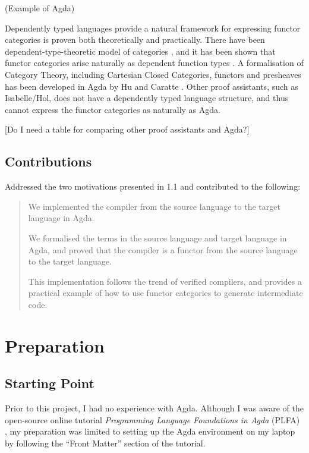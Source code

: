 \documentclass[12pt,twoside,a4paper]{report}
\theoremstyle{definition}
\newcounter{motivation}
\begin{document}
        (Example of Agda)

        Dependently typed languages provide a natural framework for expressing functor categories is proven both theoretically and practically. There have been dependent-type-theoretic model of categories \cite{Dybjer}, and it has been shown that functor categories arise naturally as dependent function types \cite{Jacobs}. A formalisation of Category Theory, including Cartesian Closed Categories, functors and presheaves has been developed in Agda by Hu and Caratte \cite{Cat_Agda}. Other proof assistants, such as Isabelle/Hol, does not have a dependently typed language structure, and thus cannot express the functor categories as naturally as Agda.

        [Do I need a table for comparing other proof assistants and Agda?]

    \section{Contributions}
        Addressed the two motivations presented in 1.1 and contributed to the following:
        \begin{quote}
            \savedmotivationI
            We implemented the compiler from the source language to the target language in Agda. 

            \savedmotivationII
            We formalised the terms in the source language and target language in Agda, and proved that the compiler is a functor from the source language to the target language. 

            \savedmotivationIII
            This implementation follows the trend of verified compilers, and provides a practical example of how to use functor categories to generate intermediate code.
        \end{quote}


\chapter{Preparation}
    \minitoc

    \section{Starting Point}
    Prior to this project, I had no experience with Agda. Although I was aware of the open-source online tutorial \textit{Programming Language Foundations in Agda} (PLFA) \cite{plfa}, my preparation was limited to setting up the Agda environment on my laptop by following the ``Front Matter'' section of the tutorial.
\end{document}

